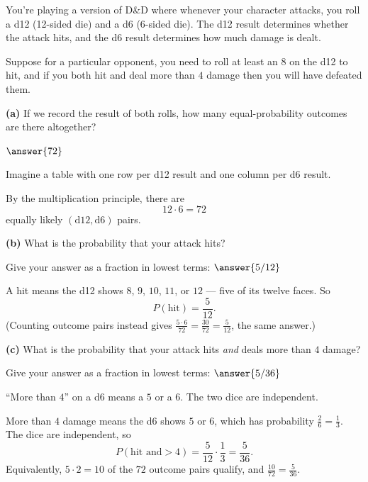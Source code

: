 \documentclass[12pt]{ximera}
\begin{document}
\begin{problem}
You're playing a version of D\&D where whenever your character attacks, you roll a
d12 (12-sided die) and a d6 (6-sided die). The d12 result determines whether the
attack hits, and the d6 result determines how much damage is dealt.

Suppose for a particular opponent, you need to roll at least an $8$ on the d12 to
hit, and if you both hit and deal more than $4$ damage then you will have defeated
them.

\begin{prompt}
\textbf{(a)} If we record the result of both rolls, how many equal-probability
outcomes are there altogether?

$\answer{72}$

\begin{hint}
Imagine a table with one row per d12 result and one column per d6 result.
\end{hint}

\begin{feedback}
By the multiplication principle, there are
\[ 12\cdot 6 = 72 \]
equally likely $(\text{d12},\text{d6})$ pairs.
\end{feedback}
\end{prompt}

\begin{prompt}
\textbf{(b)} What is the probability that your attack hits?

Give your answer as a fraction in lowest terms: $\answer{5/12}$

\begin{feedback}
A hit means the d12 shows $8$, $9$, $10$, $11$, or $12$ --- five of its twelve faces.
So
\[ P(\text{hit})=\frac{5}{12}. \]
(Counting outcome pairs instead gives $\frac{5\cdot 6}{72}=\frac{30}{72}=\frac{5}{12}$,
the same answer.)
\end{feedback}
\end{prompt}

\begin{prompt}
\textbf{(c)} What is the probability that your attack hits \emph{and} deals more than
$4$ damage?

Give your answer as a fraction in lowest terms: $\answer{5/36}$

\begin{hint}
``More than $4$'' on a d6 means a $5$ or a $6$. The two dice are independent.
\end{hint}

\begin{feedback}
More than $4$ damage means the d6 shows $5$ or $6$, which has probability
$\frac26=\frac13$. The dice are independent, so
\[
P(\text{hit and}>4)=\frac{5}{12}\cdot\frac13=\frac{5}{36}.
\]
Equivalently, $5\cdot 2=10$ of the $72$ outcome pairs qualify, and
$\frac{10}{72}=\frac{5}{36}$.
\end{feedback}
\end{prompt}


\end{problem}
\end{document}
